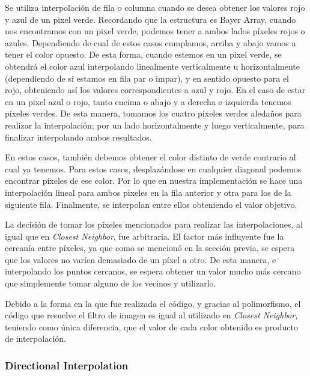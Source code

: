 Se utiliza interpolación de fila o columna cuando se desea obtener los valores rojo y azul de un pixel verde. Recordando que la estructura es Bayer Array, cuando nos encontramos con un pixel verde, podemos tener a ambos lados píxeles rojos o azules. Dependiendo de cual de estos casos cumplamos, arriba y abajo vamos a tener el color opuesto. De esta forma, cuando estemos en un pixel verde, se obtendrá el color azul interpolando linealmente verticalmente u horizontalmente (dependiendo de si estamos en fila par o impar), y en sentido opuesto para el rojo, obteniendo así los valores correspondientes a azul y rojo. En el caso de estar en un pixel azul o rojo, tanto encima o abajo y a derecha e izquierda tenemos píxeles verdes. De esta manera, tomamos los cuatro píxeles verdes aledaños para realizar la interpolación; por un lado horizontalmente y luego verticalmente, para finalizar interpolando ambos resultados. 
\par 
En estos casos, también debemos obtener el color distinto de verde contrario al cual ya tenemos. Para estos casos, desplazándose en cualquier diagonal podemos encontrar píxeles de ese color. Por lo que en nuestra implementación se hace una interpolación lineal para ambos pixeles en la fila anterior y otra para los de la siguiente fila. Finalmente, se interpolan entre ellos obteniendo el valor objetivo.
\par 
La decisión de tomar los píxeles mencionados para realizar las interpolaciones, al igual que en \textit{Closest Neighbor}, fue arbitraria. El factor más influyente fue la cercanía entre píxeles, ya que como se mencionó en la sección previa, se espera que los valores no varíen demasiado de un píxel a otro. De esta manera, e interpolando los puntos cercanos, se espera obtener un valor mucho más cercano que simplemente tomar alguno de los vecinos y utilizarlo.
\par 
Debido a la forma en la que fue realizada el código, y gracias al polimorfismo, el código que resuelve el filtro de imagen es igual al utilizado en \textit{Closest Neighbor}, teniendo como única diferencia, que el valor de cada color obtenido es producto de interpolación.

\subsubsection{Directional Interpolation}

